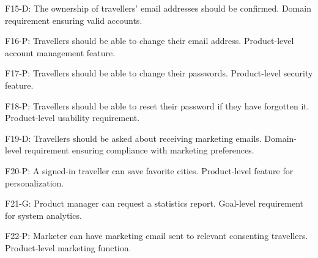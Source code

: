 F15-D: The ownership of travellers' email addresses should be confirmed.
    Domain requirement ensuring valid accounts.

F16-P: Travellers should be able to change their email address.
    Product-level account management feature.

F17-P: Travellers should be able to change their passwords.
    Product-level security feature.

F18-P: Travellers should be able to reset their password if they have forgotten it.
    Product-level usability requirement.

F19-D: Travellers should be asked about receiving marketing emails.
    Domain-level requirement ensuring compliance with marketing preferences.

F20-P: A signed-in traveller can save favorite cities.
    Product-level feature for personalization.

F21-G: Product manager can request a statistics report.
    Goal-level requirement for system analytics.

F22-P: Marketer can have marketing email sent to relevant consenting travellers.
    Product-level marketing function.

